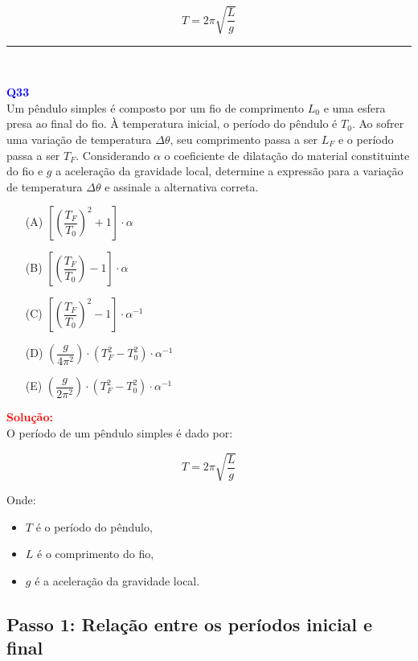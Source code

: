 \documentclass[a4paper,12pt]{article}
\begin{document}
\[
\boxed{T = 2\pi \sqrt{\frac{L}{g}}}
\]

\noindent\rule{\linewidth}{0.6pt}\\

\begin{flushleft}
\textbf{\textcolor{blue}{\Large Q33}}\\

Um pêndulo simples é composto por um fio de comprimento $L_0$ e uma esfera presa ao final do fio. À temperatura inicial, o período do 
pêndulo é $T_0$. Ao sofrer uma variação de temperatura $\Delta \theta$, seu comprimento passa a ser $L_F$ e o período passa a ser $T_F$. 
Considerando $\alpha$ o coeficiente de dilatação do material constituinte do fio e $g$ a aceleração da gravidade local, determine a 
expressão para a variação de temperatura $\Delta \theta$ e assinale a alternativa correta.


\begin{itemize}
\item[(A)] $\left[\left( \dfrac{T_F}{T_0} \right)^2 + 1 \right] \cdot \alpha$
\item[(B)] $\left[ \left( \dfrac{T_F}{T_0} \right) - 1 \right] \cdot \alpha$
\item[(C)] $\left[ \left( \dfrac{T_F}{T_0} \right)^2 - 1 \right] \cdot \alpha^{-1}$
\item[(D)] $\left(\dfrac{g}{4\pi^2} \right) \cdot \left( T_F^2 - T_0^2 \right) \cdot \alpha^{-1}$
\item[(E)] $\left(\dfrac{g}{2\pi^2} \right) \cdot \left( T_F^2 - T_0^2 \right) \cdot \alpha^{-1}$
\end{itemize}

\vspace{0.5cm}

\textcolor{red}{\textbf{Solução:}}\\

O período de um pêndulo simples é dado por:

\begin{equation}
T = 2\pi \sqrt{\frac{L}{g}}
\end{equation}

Onde:
\begin{itemize}
    \item $T$ é o período do pêndulo,
    \item $L$ é o comprimento do fio,
    \item $g$ é a aceleração da gravidade local.
\end{itemize}

\subsection*{Passo 1: Relação entre os períodos inicial e final}


\end{flushleft}
\end{document}
